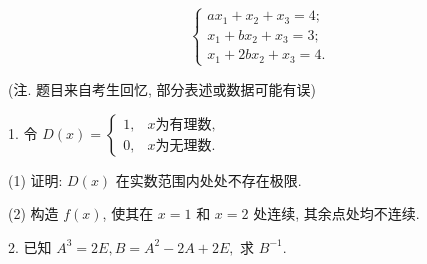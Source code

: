 \documentclass{examcollection}
\renewcommand{\displayformula}[1]{\[#1\]}
\begin{document}
{\begin{minipage}{\textwidth}
\displayformula{\left\{ \begin{array}{l} a x _ {1} + x _ {2} + x _ {3} = 4; \\ x _ {1} + b x _ {2} + x _ {3} = 3; \\ x _ {1} + 2 b x _ {2} + x _ {3} = 4. \end{array} \right.}\par
{}\smallskip
(注. 题目来自考生回忆, 部分表述或数据可能有误)\par
1. 令 $D(x) = \left\{ \begin{array}{ll} 1, & x \text{为有理数}, \\ 0, & x \text{为无理数}. \end{array} \right.$\par
(1) 证明: $D(x)$ 在实数范围内处处不存在极限.\par
(2) 构造 $f(x)$, 使其在 $x = 1$ 和 $x = 2$ 处连续, 其余点处均不连续.\par
2. 已知 $A^3 = 2E, B = A^2 - 2A + 2E,$ 求 $B^{-1}$.\par
\end{minipage}}
\ifdim\dimexpr\ht\proofbox+\dp\proofbox\relax>\textheight
\noindent\resizebox{!}{\textheight}{\usebox{\proofbox}}\else\noindent\usebox{\proofbox}\fi\clearpage
\end{document}
